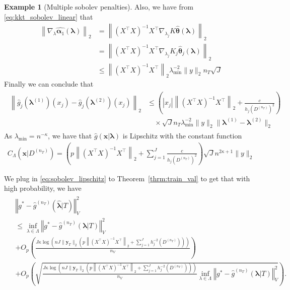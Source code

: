 \documentclass[12pt]{article} %
\theoremstyle{definition}
\newtheorem{example}{Example}
\begin{document}
\begin{example}[Multiple sobolev penalties]
	Also, we have from \eqref{eq:kkt_sobolev_linear} that
	\begin{align}
	\left \| \nabla_{\lambda} \hat{\boldsymbol{\alpha}_1}(\boldsymbol{\lambda}) \right \|_2
	& =
	\left \|
	\left(
	X^\top X
	\right)^{-1}
	X^\top
	\nabla_{\lambda_j} K \hat{\boldsymbol{\theta}}(\boldsymbol{\lambda})
	\right \|_2 \\
	& =
	\left \|
	\left(
	X^\top X
	\right)^{-1}
	X^\top
	\nabla_{\lambda_j} K_j \hat{\boldsymbol{\theta}}_j(\boldsymbol{\lambda})
	\right \|_2 \\
	& \le
	\left \|
	\left(
	X^\top X
	\right)^{-1}
	X^\top
	\right \|_2
	\lambda_{\min}^{-2} \|y\|_2 n_T \sqrt{J}
	\end{align}
	Finally we can conclude that
	\begin{align}
	\begin{split}
	\left \|
	\hat{g}_j(\boldsymbol{\lambda}^{(1)})(x_j)
	- \hat{g}_j(\boldsymbol{\lambda}^{(2)})(x_j)
	\right \|_2
	& \le
	\left(
	|x_j|
	\left \|
	\left(
	X^\top X
	\right)^{-1}
	X^\top
	\right \|_2
	+
	\frac{c }{h_j(D^{(n_T)})^2}
	\right)\\
	& \quad \times
	\sqrt{J}
	n_T
	\lambda_{\min}^{-2}
	\|y\|_2
	\| \boldsymbol{\lambda}^{(1)} - \boldsymbol{\lambda}^{(2)}\|_2
	\end{split}
	\end{align}
	As $\lambda_{\min} = n^{-\kappa}$, we have that $\hat{g}(\boldsymbol{x}|\boldsymbol{\lambda})$ is Lipschitz with the constant function
	\begin{align}
	C_\Lambda(\boldsymbol{x} | D^{(n_T)})
	=
	\left(
	p
	\left \|
	\left(
	X^\top X
	\right)^{-1}
	X^\top
	\right \|_2
	+
	\sum_{j=1}^J \frac{c }{h_j(D^{(n_T)})^2}
	\right)
	\sqrt{J}
	n^{2\kappa + 1}
	\|y\|_2
	\label{eq:sobolev_lipschitz}
	\end{align}
	
	We plug in \eqref{eq:sobolev_lipschitz} to Theorem~\ref{thrm:train_val} to get that with high probability, we have
	\begin{align}
	\begin{split}
	& \left\Vert g^* - \hat{g}^{(n_T)}( \hat{\boldsymbol{\lambda}} | T) \right\Vert _{V}^2 \\
	&\le \inf_{\lambda \in \Lambda} \left\Vert g^* - \hat{g}^{(n_T)}( \boldsymbol{\lambda} | T) \right \Vert^2_{V}\\
	& + O_p \left(\frac{J
		\kappa
		\log \left (
		n
		J
		\|\boldsymbol{y}_T\|_2
		\left(
		p
		\left \|
		\left(
		X^\top X
		\right)^{-1}
		X^\top
		\right \|_2
		+
		\sum_{j=1}^J h_j^{-2}(D^{(n_T)})
		\right)
		\right )}{n_{V}} \right)
	\\
	& + O_p \left(
	\sqrt{
		\frac{J\kappa
			\log \left (
			n
			J
			\|\boldsymbol{y}_T\|_2
			\left(
			p
			\left \|
			\left(
			X^\top X
			\right)^{-1}
			X^\top
			\right \|_2
			+
			\sum_{j=1}^J h_j^{-2}(D^{(n_T)})
			\right)
			\right )}{n_{V}}
		\inf_{\lambda \in \Lambda}
		\left\Vert g^* - \hat{g}^{(n_T)}(\boldsymbol{\lambda}| T) \right \Vert^2_{V}
	}
	\right ).
	\end{split}
	\end{align}
\end{example}
\end{document}
